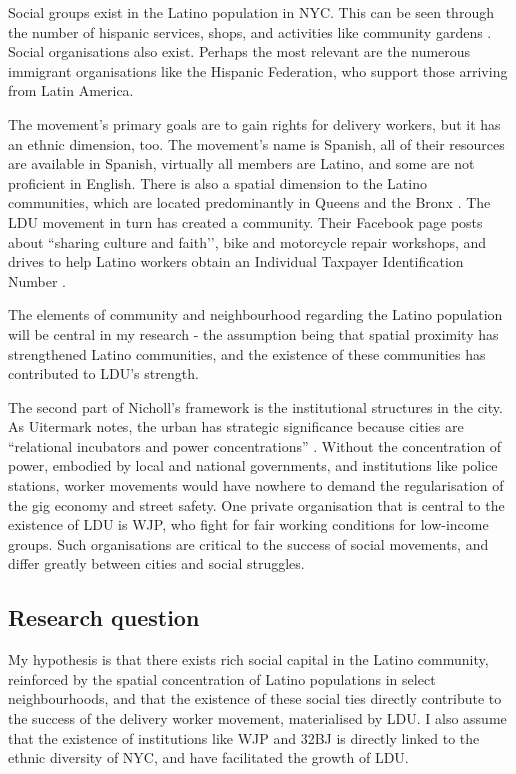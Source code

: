\documentclass{article}[12pt]
\begin{document}
Social groups exist in the Latino population in NYC. This can be seen through the number of hispanic services, shops, and activities like community gardens \parencite{saldivar2004culturing}. Social organisations also exist. Perhaps the most relevant are the numerous immigrant organisations like the Hispanic Federation, who support those arriving from Latin America. 

The movement’s primary goals are to gain rights for delivery workers, but it has an ethnic dimension, too. The movement’s name is Spanish, all of their resources are available in Spanish, virtually all members are Latino, and some are not proficient in English. There is also a spatial dimension to the Latino communities, which are located predominantly in Queens and the Bronx \parencite{nycimmigrantpopulation2021}. The LDU movement in turn has created a community. Their Facebook page posts about ``sharing culture and faith’’, bike and motorcycle repair workshops, and drives to help Latino workers obtain an Individual Taxpayer Identification Number \parencite{facebookldu}.

The elements of community and neighbourhood regarding the Latino population will be central in my research - the assumption being that spatial proximity has strengthened Latino communities, and the existence of these communities has contributed to LDU’s strength.

The second part of Nicholl's framework is the institutional structures in the city. As Uitermark notes, the urban has strategic significance because cities are ``relational incubators and power concentrations'' \parencite{uitermark2012cities}. Without the concentration of power, embodied by local and national governments, and institutions like police stations, worker movements would have nowhere to demand the regularisation of the gig economy and street safety. One private organisation that is central to the existence of LDU is WJP, who fight for fair working conditions for low-income groups. Such organisations are critical to the success of social movements, and differ greatly between cities and social struggles.

\subsection{Research question}

My hypothesis is that there exists rich social capital in the Latino community, reinforced by the spatial concentration of Latino populations in select neighbourhoods, and that the existence of these social ties directly contribute to the success of the delivery worker movement, materialised by LDU. 
I also assume that the existence of institutions like WJP and 32BJ is directly linked to the ethnic diversity of NYC, and have facilitated the growth of LDU.
\end{document}
